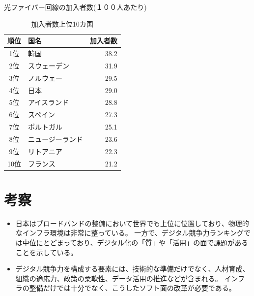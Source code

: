 \documentclass[a4paper,11pt,dvipdfmx]{ujarticle}
\begin{document}
\begin{table}[htbp]
    \centering
    \caption{光ファイバー回線の加入者数(１００人あたり)}
    \label{tbl:利用状況}

    \begin{tabular}{|c|l|r|}\hline
        順位 & 国名 & 加入者数 \\\hline
        1位 & 韓国 & 38.2 \\\hline
        2位 & スウェーデン & 31.9 \\\hline
        3位 & ノルウェー & 29.5 \\\hline
        4位 & 日本 & 29.0 \\\hline
        5位 & アイスランド & 28.8 \\\hline
        6位 & スペイン & 27.3 \\\hline
        7位 & ポルトガル & 25.1 \\\hline
        8位 & ニュージーランド & 23.6 \\\hline
        9位 & リトアニア & 22.3 \\\hline
        10位 & フランス & 21.2 \\\hline
    \end{tabular}
\caption{加入者数上位10カ国}
\end{table}

\section{考察}
\begin{itemize} 
   \item 日本はブロードバンドの整備において世界でも上位に位置しており、物理的なインフラ環境は非常に整っている。
 一方で、デジタル競争力ランキングでは中位にとどまっており、デジタル化の「質」や「活用」の面で課題があることを示している。
   \item デジタル競争力を構成する要素には、技術的な準備だけでなく、人材育成、組織の適応力、政策の柔軟性、データ活用の推進などが含まれる。
インフラの整備だけでは十分でなく、こうしたソフト面の改革が必要である。 
\end{itemize}


\end{document}
